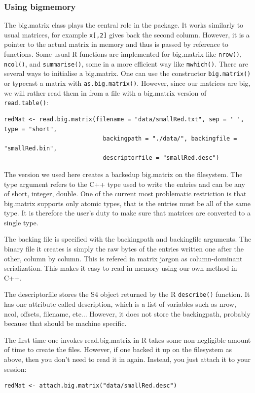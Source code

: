 \documentclass[a4paper,11pt]{amsart}
\begin{document}
\subsubsection{Using bigmemory}
The big.matrix class plays the central role in the package. It works similarly to usual matrices, for example \verb|x[,2]| gives back the second column. However, it is a pointer to the actual matrix in memory and thus is passed by reference to functions. Some usual R functions are implemented for big.matrix like \verb|nrow()|, \verb|ncol()|, and \verb|summarise()|, some in a more efficient way like \verb|mwhich()|. There are several ways to initialise a big.matrix. One can use the constructor \verb|big.matrix()| or typecast a matrix with \verb|as.big.matrix()|. However, since our matrices are big, we will rather read them in from a file with a big.matrix version of \verb|read.table()|: 
\begin{verbatim}
redMat <- read.big.matrix(filename = "data/smallRed.txt", sep = ' ', type = "short",
                            backingpath = "./data/", backingfile = "smallRed.bin",
                            descriptorfile = "smallRed.desc")
\end{verbatim}
The version we used here creates a backedup big.matrix on the filesystem. The type argument refers to the C++ type used to write the entries and can be any of short, integer, double. One of the current most problematic restriction is that big.matrix supports only atomic types, that is the entries must be all of the same type. It is therefore the user's duty to make sure that matrices are converted to a single type. 

The backing file is specified with the backingpath and backingfile arguments. The binary file it creates is simply the raw bytes of the entries written one after the other, column by column. This is refered in matrix jargon as column-dominant serialization. This makes it easy to read in memory using our own method in C++. 

The descriptorfile stores the S4 object returned by the R \verb|describe()| function. It has one attribute called description, which is a list of variables such as nrow, ncol, offsets, filename, etc... However, it does not store the backingpath, probably because that should be machine specific. 

The first time one invokes read.big.matrix in R takes some non-negligible amount of time to create the files. However, if one backed it up on the filesystem as above, then you don't need to read it in again. Instead, you just attach it to your session:
\begin{verbatim}
redMat <- attach.big.matrix("data/smallRed.desc")
\end{verbatim}
\end{document}
